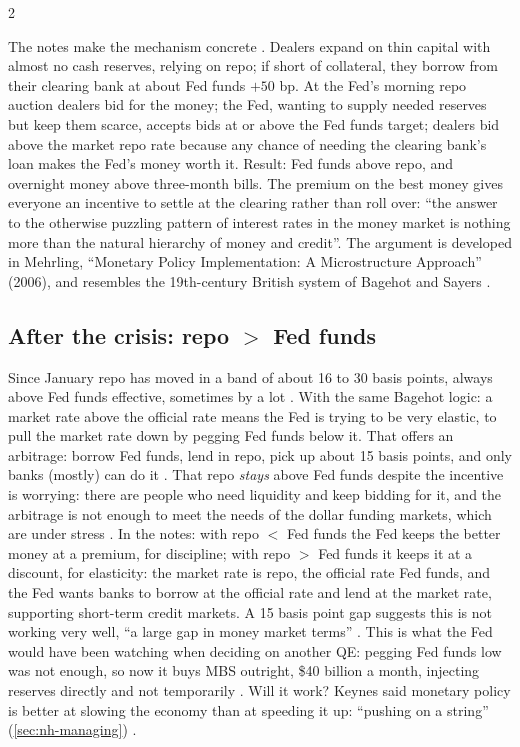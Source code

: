 \begin{paracol}{2}
\begin{intuition}
The notes make the mechanism concrete . Dealers expand on thin capital with almost no cash reserves, relying on repo; if short of collateral, they borrow
from their clearing bank at about Fed funds $+50$ bp. At the Fed's morning repo auction dealers bid for the money; the Fed, wanting to supply needed reserves but keep them
scarce, accepts bids at or above the Fed funds target; dealers bid above the market repo rate because any chance of needing the clearing bank's loan makes the Fed's money
worth it. Result: Fed funds above repo, and overnight money above three-month bills. The premium on the best money gives everyone an incentive to settle at the clearing
rather than roll over: ``the answer to the otherwise puzzling pattern of interest rates in the money market is nothing more than the natural hierarchy of money and
credit''. The argument is developed in Mehrling, ``Monetary Policy Implementation: A Microstructure Approach'' (2006), and resembles the 19th-century British system of
Bagehot and Sayers .
\end{intuition}

\subsection{After the crisis: repo $>$ Fed funds}
Since January repo has moved in a band of about 16 to 30 basis points, always above Fed funds effective, sometimes by a lot . With the
same Bagehot logic: a market rate above the official rate means the Fed is trying to be very elastic, to pull the market rate down by pegging Fed funds below it. That
offers an arbitrage: borrow Fed funds, lend in repo, pick up about 15 basis points, and only banks (mostly) can do it . That
repo \emph{stays} above Fed funds despite the incentive is worrying: there are people who need liquidity and keep bidding for it, and the arbitrage is not enough to meet
the needs of the dollar funding markets, which are under stress . In the notes: with repo $<$ Fed funds the Fed keeps the better money at a premium, for
discipline; with repo $>$ Fed funds it keeps it at a discount, for elasticity: the market rate is repo, the official rate Fed funds, and the Fed wants banks to borrow at
the official rate and lend at the market rate, supporting short-term credit markets. A 15 basis point gap suggests this is not working very well, ``a large gap in money
market terms'' . This is what the Fed would have been watching when deciding
on another QE: pegging Fed funds low was not enough, so now it buys MBS outright, \$40 billion a month, injecting reserves directly and not temporarily
. Will it work? Keynes said monetary policy is better at slowing the economy than at speeding it up: ``pushing on a string''
(\cref{sec:nh-managing}) .


\end{paracol}
